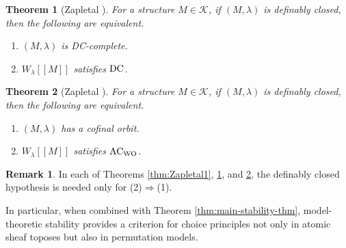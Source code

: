 \documentclass[10pt]{amsart}
\numberwithin{equation}{section}
\theoremstyle{plain}
\newtheorem{theorem}{Theorem}[section]
\theoremstyle{definition}
\newtheorem*{remark}{Remark}
\newcommand{\K}{\mathcal{K}}
\begin{document}
\begin{theorem}[Zapletal {\cite[Theorem 4.3]{Zap26}}]\label{thm:Zapletal2}
For a structure $M\in\K$, if $(M,\lambda)$ is definably closed, then the following are equivalent.
\begin{enumerate}
\item $(M,\lambda)$ is {\rm DC}-complete.
\item $W_\lambda[[M]]$ satisfies ${\rm DC}$.
\end{enumerate}
\end{theorem}

\begin{theorem}[Zapletal {\cite[Theorem 3.3]{Zap26}}]\label{thm:Zapletal3}
For a structure $M\in\K$, if $(M,\lambda)$ is definably closed, then the following are equivalent.
\begin{enumerate}
\item $(M,\lambda)$ has a cofinal orbit.
\item $W_\lambda[[M]]$ satisfies ${\rm AC}_{\rm WO}$.
\end{enumerate}
\end{theorem}


\begin{remark}
In each of Theorems \ref{thm:Zapletal1}, \ref{thm:Zapletal2}, and \ref{thm:Zapletal3}, the definably closed hypothesis is needed only for (2)$\Rightarrow$(1).
\end{remark}

In particular, when combined with Theorem \ref{thm:main-stability-thm},
model-theoretic stability provides a criterion for choice principles not only in atomic sheaf toposes but also in permutation models.
\end{document}
